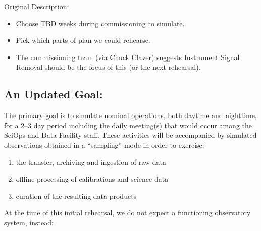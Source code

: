\underline{Original Description:}
\begin{itemize}[topsep=-8pt]
\item Choose TBD weeks during commissioning to simulate.
\item Pick which parts of plan we could rehearse.
\item The commissioning team (via Chuck Claver) suggests Instrument Signal Removal should be the focus 
of this (or the next rehearsal).
\end{itemize}

\subsection{An Updated Goal:}

The primary goal is to simulate nominal operations, both daytime and nighttime, for a 2--3 day 
period including the daily meeting(s) that would occur among the SciOps and 
Data Facility staff.  These activities will be accompanied by simulated 
observations obtained in a ``sampling'' mode in order to exercise:
\begin{enumerate}[topsep=-8pt]
\item the transfer, archiving and ingestion of raw data
\item offline processing of calibrations and science data
\item curation of the resulting data products
\end{enumerate}

At the time of this initial rehearsal, we do not expect a functioning 
observatory system, instead:

